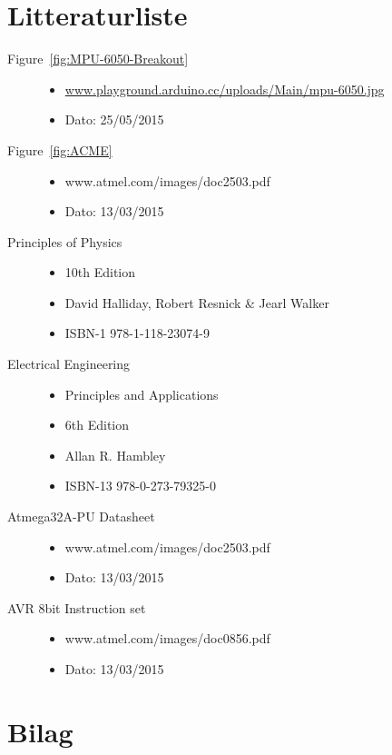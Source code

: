\section{Litteraturliste}

\begin{description}
	\item[Figure~\ref{fig:MPU-6050-Breakout}] \hfill
		\begin{itemize}
			\item \url{www.playground.arduino.cc/uploads/Main/mpu-6050.jpg}
			\item Dato: 25/05/2015
		\end{itemize}

	\item[Figure~\ref{fig:ACME}] \hfill
		\begin{itemize}
			\item www.atmel.com/images/doc2503.pdf
			\item Dato: 13/03/2015
		\end{itemize}
		
		\item[Principles of Physics] \hfill
		\begin{itemize}
			\item 10th Edition
			\item David Halliday, Robert Resnick \& Jearl Walker
			\item ISBN-1 978-1-118-23074-9
		\end{itemize}
	\item[Electrical Engineering] \hfill
		\begin{itemize}
			\item Principles and Applications
			\item 6th Edition
			\item Allan R. Hambley
			\item ISBN-13 978-0-273-79325-0
		\end{itemize}
	\item[Atmega32A-PU Datasheet] \hfill
		\begin{itemize}
			\item www.atmel.com/images/doc2503.pdf
			\item Dato: 13/03/2015
		\end{itemize}
	\item[AVR 8bit Instruction set] \hfill
		\begin{itemize}
			\item www.atmel.com/images/doc0856.pdf
			\item Dato: 13/03/2015
		\end{itemize}
\end{description}

\section{Bilag}

